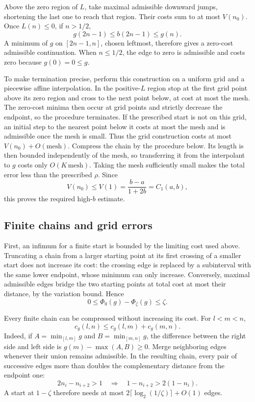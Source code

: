 Above the zero region of \(L\), take maximal admissible downward
jumps, shortening the last one to reach that region. Their costs
sum to at most \(V(n_0)\). Once \(L(n)\le0\), if \(n>1/2\),
\[
 g(2n-1)\le b(2n-1)\le g(n).
\]
A minimum of \(g\) on \([2n-1,n]\), chosen leftmost, therefore
gives a zero-cost admissible continuation. When \(n\le1/2\), the
edge to zero is admissible and costs zero because \(g(0)=0\le g\).

To make termination precise, perform this construction on a uniform grid
and a piecewise affine interpolation. In the positive-\(L\) region stop
at the first grid point above its zero region and cross to the next
point below, at cost at most the mesh. The zero-cost minima then occur
at grid points and strictly decrease the endpoint, so the procedure
terminates. If the prescribed start is not on this grid, an initial
step to the nearest point below it costs at most the mesh and is
admissible once the mesh is small. Thus the grid construction costs
at most \(V(n_0)+O(\text{mesh})\). Compress the chain by the
procedure below. Its length is then bounded independently of the mesh,
so transferring it from the interpolant to \(g\) costs only
\(O(K\,\text{mesh})\). Taking the mesh sufficiently small makes
the total error less than the prescribed \(\rho\). Since
\[
 V(n_0)\le V(1)=\frac{b-a}{1+2b}=C_1(a,b),
\]
this proves the required high-\(b\) estimate.

\subsection{Finite chains and grid errors}

First, an infimum for a finite start is bounded by the limiting cost
used above. Truncating a chain from a larger starting point at its
first crossing of a smaller start does not increase its cost:
the crossing edge is replaced by a subinterval with the same lower
endpoint, whose minimum can only increase. Conversely, maximal
admissible edges bridge the two starting points at total cost at
most their distance, by the variation bound. Hence
\[
 0\le\Phi_0(g)-\Phi_\zeta(g)\le\zeta .
\]

Every finite chain can be compressed without increasing its cost.
For \(l<m<n\),
\[
 c_g(l,n)\le c_g(l,m)+c_g(m,n).
\]
Indeed, if \(A=\min_{[l,m]}g\) and \(B=\min_{[m,n]}g\), the
difference between the right side and left side is
\(g(m)-\max(A,B)\ge0\). Merge neighboring edges whenever their
union remains admissible. In the resulting chain, every pair of
successive edges more than doubles the complementary distance
from the endpoint one:
\[
 2n_i-n_{i+2}>1
 \quad\Longrightarrow\quad
 1-n_{i+2}>2(1-n_i).
\]
A start at \(1-\zeta\) therefore needs at most
\(2\lceil\log_2(1/\zeta)\rceil+O(1)\) edges.

